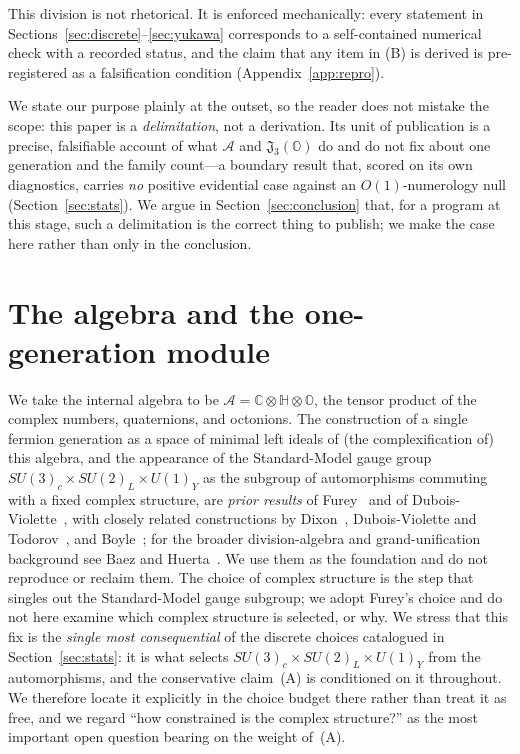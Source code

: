 \documentclass[11pt,a4paper]{article}
\theoremstyle{plain}
\newcommand{\CHO}{\mathbb{C}\otimes\mathbb{H}\otimes\mathbb{O}}
\newcommand{\Alg}{\mathcal{A}}
\newcommand{\JO}{\mathfrak{J}_3(\mathbb{O})}
\begin{document}
This division is not rhetorical. It is enforced mechanically: every statement in
Sections~\ref{sec:discrete}--\ref{sec:yukawa} corresponds to a self-contained
numerical check with a recorded status, and the claim that any item in (B) is
derived is pre-registered as a falsification condition (Appendix~\ref{app:repro}).

We state our purpose plainly at the outset, so the reader does not mistake the
scope: this paper is a \emph{delimitation}, not a derivation. Its unit of
publication is a precise, falsifiable account of what $\Alg$ and $\JO$ do and do
not fix about one generation and the family count---a boundary result that, scored
on its own diagnostics, carries \emph{no} positive evidential case against an
$O(1)$-numerology null (Section~\ref{sec:stats}). We argue in
Section~\ref{sec:conclusion} that, for a program at this stage, such a delimitation
is the correct thing to publish; we make the case here rather than only in the
conclusion.

\section{The algebra and the one-generation module}
\label{sec:algebra}

We take the internal algebra to be $\Alg = \CHO$, the tensor product of the
complex numbers, quaternions, and octonions. The construction of a single fermion
generation as a space of minimal left ideals of (the complexification of) this
algebra, and the appearance of the Standard-Model gauge group
$SU(3)_c \times SU(2)_L \times U(1)_Y$ as the subgroup of automorphisms commuting
with a fixed complex structure, are \emph{prior results} of
Furey~\cite{furey2015,furey2018} and of Dubois-Violette~\cite{duboisviolette2016},
with closely related constructions by Dixon~\cite{dixon1994},
Dubois-Violette and Todorov~\cite{todorov2018}, and Boyle~\cite{boyle2020}; for the
broader division-algebra and grand-unification background see Baez and
Huerta~\cite{baez2010}. We use
them as the foundation and do not reproduce or reclaim them. The choice of complex
structure is the step that singles out the Standard-Model gauge subgroup; we adopt
Furey's choice and do not here examine which complex structure is selected, or
why. We stress that this fix is the \emph{single most consequential} of the
discrete choices catalogued in Section~\ref{sec:stats}: it is what selects
$SU(3)_c \times SU(2)_L \times U(1)_Y$ from the automorphisms, and the conservative
claim~(A) is conditioned on it throughout. We therefore locate it explicitly in the
choice budget there rather than treat it as free, and we regard ``how constrained
is the complex structure?'' as the most important open question bearing on the
weight of~(A).
\end{document}
